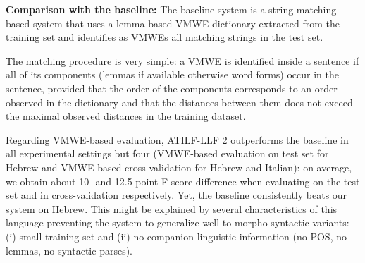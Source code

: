 \documentclass[output=paper,modfonts]{langscibook}
\begin{document}
\textbf{Comparison with the baseline:}
The baseline system is a string matching-based system that uses a lemma-based VMWE dictionary extracted from the training set and identifies as VMWEs all matching strings in the test set. 

The matching procedure is very simple: a VMWE is identified inside a sentence if all of its components (lemmas if available otherwise word forms) occur in the sentence, provided that the order of the components corresponds to an order observed in the dictionary and that the distances between them does not exceed the maximal observed distances in the training dataset.

Regarding VMWE-based evaluation, ATILF-LLF 2 outperforms the baseline in all experimental settings but four (VMWE-based  evaluation on test set for Hebrew and VMWE-based cross-validation for Hebrew and Italian): on average, we obtain about 10- and 12.5-point F-score difference when evaluating on the test set and in cross-validation respectively. Yet, the baseline consistently beats our system on Hebrew. This might be explained by several characteristics of this language preventing the system to generalize well to morpho-syntactic variants: (i) small training set and (ii) no companion linguistic information (no POS, no lemmas, no syntactic parses).
\end{document}
